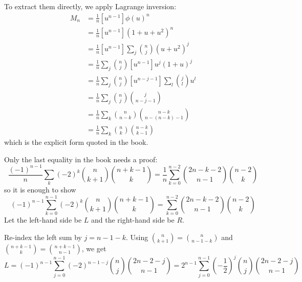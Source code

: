To extract them directly, we apply Lagrange inversion:
\begin{equation*}
    \begin{aligned}
        M_{n}
        &= \frac{1}{n} [u^{n - 1}] \phi(u)^{n} \\
        &= \frac{1}{n} [u^{n - 1}] (1 + u + u^{2})^{n} \\
        &= \frac{1}{n} [u^{n - 1}] \sum_{j} \binom{n}{j}(u + u^{2})^{j} \\
        &= \frac{1}{n} \sum_{j} \binom{n}{j} [u^{n - 1}] u^{j}(1 + u)^{j} \\
        &= \frac{1}{n} \sum_{j} \binom{n}{j} [u^{n - j - 1}] \sum_{l} \binom{j}{l} u^{l} \\
        &= \frac{1}{n} \sum_{j} \binom{n}{j} \binom{j}{n - j - 1} \\
        &= \frac{1}{n} \sum_{k} \binom{n}{n - k} \binom{n - k}{n - (n - k) - 1} \\
        &= \frac{1}{n} \sum_{k} \binom{n}{k} \binom{n - k}{k - 1}
    \end{aligned}
\end{equation*}
which is the explicit form quoted in the book.


Only the last equality in the book needs a proof:
\begin{equation*}
    \frac{(-1)^{n - 1}}{n} \sum_{k}(-2)^{k} \binom{n}{k + 1} \binom{n + k - 1}{k} =
        \frac{1}{n} \sum_{k = 0}^{n - 2} \binom{2n - k - 2}{n - 1} \binom{n - 2}{k}
\end{equation*}
so it is enough to show
\begin{equation*}
    (-1)^{n - 1} \sum_{k = 0}^{n - 1}(-2)^{k} \binom{n}{k + 1} \binom{n + k - 1}{k} = \sum_{k = 0}^{n - 2} \binom{2n - k - 2}{n - 1} \binom{n - 2}{k}
\end{equation*}
Let the left-hand side be $L$ and the right-hand side be $R$.

Re-index the left sum by $j = n - 1 - k$. Using
$\binom{n}{k + 1} = \binom{n}{n - 1 - k}$ and
$\binom{n + k - 1}{k} = \binom{n + k - 1}{n - 1}$, we get
\begin{equation*}
    L = (-1)^{n - 1} \sum_{j = 0}^{n - 1}(-2)^{n - 1 - j} \binom{n}{j} \binom{2n - 2 - j}{n - 1} =
        2^{n - 1} \sum_{j = 0}^{n - 1} \left(-\frac{1}{2} \right)^{j} \binom{n}{j} \binom{2n - 2 - j}{n - 1}
\end{equation*}

